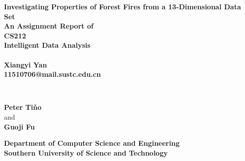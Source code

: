 \documentclass[titlepage,a4paper,12pt,thmsb]{report}
\begin{document}
\begin{titlepage}
\thispagestyle{empty}
\begin{center}
{\LARGE \bf{ Investigating Properties of Forest Fires from a 13-Dimensional
Data Set}} \\
\vspace{2.0cm}
\large \bf{An Assignment Report of } \\
\large \bf{CS212\\ Intelligent Data Analysis} \\
\vspace{0.5cm}
\large {} \\
\vspace{0.5cm}
\rm
{\large \bf {Xiangyi Yan}}\\
\vspace{0.5cm}
\bf{11510706@mail.sustc.edu.cn} \\

\vspace{1cm}

{} \\
\vspace{.5cm}

\hspace{.05cm} {\bf {Peter Ti\v{n}o}}\\
\hspace{.05cm} {\sc and}\\
\hspace{.05cm} {\bf {Guoji Fu}}\\
\vspace{0.5cm}
\vspace{0.5cm}

\begin{figure}[h]
{\par}
\end{figure}

\vskip 0.5cm

\large{\bf Department of Computer Science and Engineering} \\
\vskip 0.5cm
\Large{\bf Southern University of Science and Technology}\\
\vskip 0.5cm
{\centering {}}
\end{center}
\pagebreak
\end{titlepage}
\end{document}
